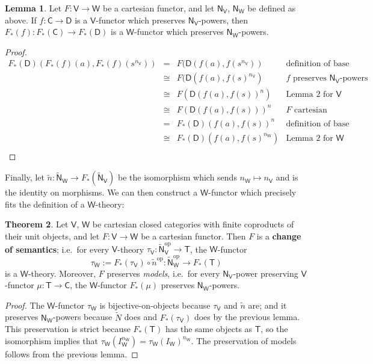 \documentclass{amsart}
\theoremstyle{definition}
\newtheorem{theorem}{Theorem}
\newtheorem{lemma}[theorem]{Lemma}
\newcommand{\NN}{\mathsf{N}}
\newcommand{\V}{\mathsf{V}}
\newcommand{\W}{\mathsf{W}}
\newcommand{\D}{\mathsf{D}}
\newcommand{\C}{\mathsf{C}}
\newcommand{\T}{\mathsf{T}}
\newcommand{\op}{\mathrm{op}}
\newcommand{\maps}{\colon}
\begin{document}
\begin{lemma}
	Let $F\maps \V \to \W$ be a cartesian functor, and let $\NN_\V$, $\NN_\W$ be defined as above. If $f\maps \C \to \D$ is a $\V$-functor which preserves $\NN_\V$-powers, then $F_*(f)\maps F_*(\C)\to F_*(\D)$ is a $\W$-functor which preserves $\NN_\W$-powers.
\end{lemma}
\begin{proof}
	\[\begin{array}{rcll}
	F_*(\D)(F_*(f)(a),F_*(f)(s^{n_\V})) & = & F(\D(f(a),f(s^{n_\V})) & \text{definition of base change}\\
	& \cong & F(\D(f(a),f(s)^{n_\V}) & f \text{ preserves } \NN_\V \text{-powers}\\
	& \cong & F(\D(f(a),f(s))^n) & \text{Lemma 2 for } \V\\
	& \cong & F(\D(f(a),f(s)))^n & F \text{ cartesian}\\
	& = & F_*(\D)(f(a),f(s))^n & \text{definition of base change}\\
	& \cong & F_*(\D)(f(a),f(s)^{n_\W}) & \text{Lemma 2 for } \W\\
	\end{array}\]
\end{proof}

Finally, let $\tilde{n}\maps \tilde{\NN}_\W \to F_*(\tilde{\NN}_\V)$ be the isomorphism which sends $n_\W \mapsto n_\V$ and is the identity on morphisms. We can then construct a $\W$-functor which precisely fits the definition of a $\W$-theory:

\begin{theorem}
	Let $\V$, $\W$ be cartesian closed categories with finite coproducts of their unit objects, and let $F\maps \V \to \W$ be a cartesian functor. Then $F$ is a \textbf{change of semantics}; i.e.\ for every $\V$-theory $\tau_\V\maps \tilde{\NN}_\V^\op \to \T$, the $\W$-functor $$\tau_\W := F_*(\tau_\V) \circ \tilde{n}^\op\maps \tilde{\NN}_\W^\op \to F_*(\T)$$ is a $\W$-theory. Moreover, $F$ preserves \textit{models}, i.e.\ for every $\NN_\V$-power preserving $\V$-functor $\mu\maps\T \to \C$, the $\W$-functor $F_*(\mu)$ preserves $\NN_\W$-powers.
\end{theorem}
\begin{proof}
	The $\W$-functor $\tau_\W$ is bijective-on-objects because $\tau_\V$ and $\tilde{n}$ are; and it preserves $\NN_\W$-powers because $\tilde{N}$ does and $F_*(\tau_\V)$ does by the previous lemma. This preservation is strict because $F_*(\T)$ has the same objects as $\T$, so the isomorphism implies that $\tau_\W(I_\W^{n_\W}) = \tau_\W(I_\W)^{n_\W}$. The preservation of models follows from the previous lemma.
\end{proof}
\end{document}

